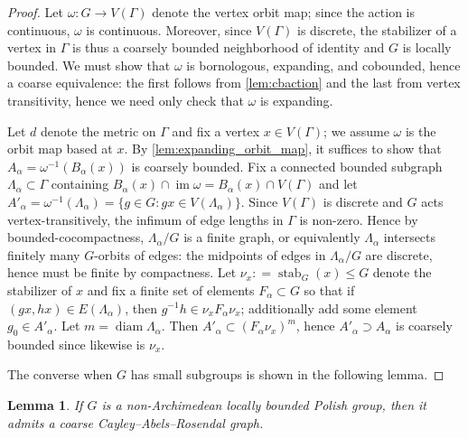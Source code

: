 \documentclass[twoside]{amsart}
\theoremstyle{plain}
\newtheorem{lemma}[theorem]{Lemma}
\theoremstyle{break}
\theoremstyle{definition}
\theoremstyle{remark}
\newcommand{\dfn}{\mathrel{\mathop:}=}
\DeclareMathOperator{\img}{im}
\DeclareMathOperator{\diam}{diam}
\DeclareMathOperator{\stab}{stab}
\begin{document}
\begin{proof}
  Let $\omega : G \to V(\Gamma)$ denote the vertex orbit map; since
  the action is continuous, $\omega$ is continuous.  
  Moreover, since $V(\Gamma)$ is discrete, the stabilizer of a vertex in $\Gamma$ is thus a coarsely
  bounded neighborhood of identity and $G$ is locally bounded.  We
  must show that $\omega$ is bornologous, expanding, and cobounded,
  hence a coarse equivalence: 
  the first follows from \cref{lem:cbaction} and the last from
  vertex transitivity, hence we need only check that $\omega$ is
  expanding. 

  Let $d$ denote the metric on $\Gamma$ and fix a vertex $x \in
  V(\Gamma)$; we assume $\omega$ is the orbit map based at $x$. 
  By \cref{lem:expanding_orbit_map}, 
  it suffices to show that $A_\alpha = \omega^{-1}(B_\alpha(x))$ is coarsely
  bounded.     Fix a connected bounded subgraph $\Lambda_\alpha
  \subset \Gamma$ containing $B_\alpha(x) \cap \img \omega =
  B_{\alpha}(x) \cap V(\Gamma)$ and let $A'_\alpha =
  \omega^{-1}(\Lambda_\alpha) = \{g \in G : gx \in
  V(\Lambda_\alpha)\}$.  Since $V(\Gamma)$ is discrete and $G$ acts
  vertex-transitively, the infimum of edge lengths in $\Gamma$ is
  non-zero. Hence by bounded-cocompactness, $\Lambda_\alpha / G$ is
  a finite graph, 
  or equivalently $\Lambda_\alpha$ intersects finitely many $G$-orbits of
  edges: the midpoints of edges in $\Lambda_\alpha/G$ are discrete, hence
  must be finite by compactness.   Let $\nu_x \dfn \stab_G(x) \leq G$ denote the
  stabilizer of $x$ and fix a finite set of elements $F_\alpha
  \subset G$ so
  that if $(gx,hx) \in E(\Lambda_\alpha)$, then $g^{-1}h \in
  \nu_x F_\alpha \nu_x$;
  additionally add some element $g_0 \in A'_\alpha$.  Let $m = \diam
  \Lambda_\alpha$.  Then $A'_\alpha \subset (F_\alpha \nu_x)^m$,
  hence $A'_\alpha \supset A_\alpha$ 
  is coarsely bounded since likewise is $\nu_x$.

  The converse when $G$ has small subgroups is shown in the
  following lemma.
\end{proof}

\begin{lemma}\label{lem:ccar_existence}
  If $G$ is a non-Archimedean locally bounded Polish group, 
  then it admits a coarse Cayley--Abels--Rosendal graph.
\end{lemma}
\end{document}
